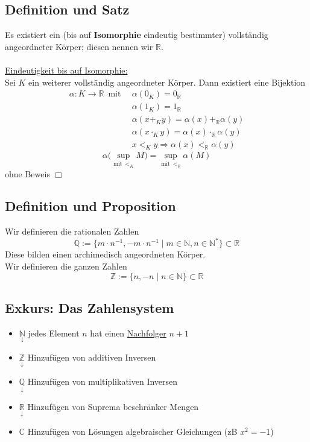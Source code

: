 \subsection{Definition und Satz} %
\label{sub:definition_und_satz}
Es existiert ein (bis auf \textbf{Isomorphie} eindeutig bestimmter) vollständig angeordneter Körper; diesen nennen wir $\mathds{R}$. \\
\vspace{\baselineskip} \\
\underline{Eindeutigkeit bis auf Isomorphie:} \\
Sei $K$ ein weiterer vollständig angeordneter Körper. Dann existiert eine Bijektion
\begin{align*}
	\alpha : K \to \mathds{R} \enspace \text{mit} \enspace &\alpha (0_K) = 0_{\mathds{R}} \\
	&\alpha(1_K) = 1_{\mathds{R}}\\
	&\alpha(x +_K y) = \alpha (x) +_{\mathds{R}} \alpha(y) \\
	&\alpha(x \cdot_K y)= \alpha (x) \cdot_{\mathds{R}} \alpha (y) \\
	&x <_K y \Rightarrow \alpha (x) <_{\mathds{R}} \alpha (y)
\end{align*}
\[
	\alpha \big( \underset{\text{mit} \enspace <_K}{\sup} M \big) 
	= \underset{\text{mit} \enspace <_{\mathds{R}}}{\sup} \alpha (M)
\]
ohne Beweis $\Box$

\subsection{Definition und Proposition} %
\label{sub:definition_und_proposition}
Wir definieren die rationalen Zahlen
\[
	\mathds{Q} := \big\{ m \cdot n ^{-1} , - m \cdot  n ^{-1} \mid m \in \mathds{N}, n \in \mathds{N}^* \big\} \subset \mathds{R}
\]
Diese bilden einen archimedisch angeordneten Körper. \\
Wir definieren die ganzen Zahlen
\[
	\mathds{Z} := \big\{ n, -n \mid n \in \mathds{N} \big\} \subset \mathds{R}
\]

\subsection{Exkurs: Das Zahlensystem} %
\label{sub:exkurs_das_zahlensystem}
\begin{itemize}[{}]
	\item $\underset{\downarrow}{\mathds{N}}$ \quad \quad jedes Element $n$ hat einen \underline{Nachfolger} $n+1$ 
	\item $\underset{\downarrow}{\mathds{Z}}$ \quad \quad Hinzufügen von additiven Inversen
	\item $\underset{\downarrow}{\mathds{Q}}$ \quad \quad Hinzufügen von multiplikativen Inversen
	\item $\underset{\downarrow}{\mathds{R}}$ \quad \quad Hinzufügen von Suprema beschränker Mengen
	\item $\mathds{C}$ \quad \quad Hinzufügen von Lösungen algebraischer Gleichungen (zB $x^2 = -1$)
\end{itemize}

